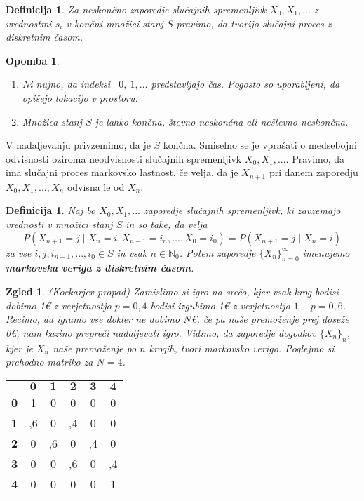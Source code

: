 \documentclass[a4paper,12pt]{article}
\def\N{\mathbb{N}} %
\newtheorem{opomba}[izrek]{Opomba}
\newtheorem{definicija}[izrek]{Definicija}
\newtheorem{zgled}[izrek]{Zgled}
\begin{document}
\begin{definicija}
    Za neskončno zaporedje slučajnih spremenljivk $X_0, X_1, ...$ z vrednostmi $s_i$ v končni množici stanj $S$ pravimo, 
    da tvorijo slučajni proces z diskretnim časom.
\end{definicija}

\begin{opomba}

    \begin{enumerate}
        \item Ni nujno, da indeksi \ $0, \ 1, ...$ predstavljajo čas. Pogosto so uporabljeni, da opišejo lokacijo v prostoru. 
        \item Množica stanj $S$ je lahko končna, števno neskončna ali neštevno neskončna. 
    \end{enumerate}

\end{opomba}

V nadaljevanju privzemimo, da je $S$ končna. Smiselno se je vprašati o medsebojni odvisnosti oziroma neodvisnosti slučajnih spremenljivk $X_0,  X_1, ...$. Pravimo, da ima slučajni proces 
markovsko lastnost, če velja, da je $X_{n+1}$ pri danem zaporedju $X_0,  X_1, ...,  X_n$ odvisna le od $X_n$.

\begin{definicija}
    Naj bo $X_0,  X_1, ...$ zaporedje slučajnih spremenljivk, ki zavzemajo vrednosti v množici stanj $S$ in so take, da velja
    $$P(X_{n+1}=j \mid X_n = i,  X_{n-1} = i_n,  ...,  X_0 = i_0) = P(X_{n+1}=j \mid X_n = i)$$
    za vse $i, j, i_{n-1}, ..., i_0 \in S$ in vsak $n \in \N_0$. Potem zaporedje $\{X_n\}_{n=0}^{\infty}$ imenujemo 
    \textbf{markovska veriga z diskretnim časom}.
\end{definicija}


\begin{zgled}
(Kockarjev propad)
Zamislimo si igro na srečo, kjer vsak krog bodisi dobimo
 1€ z verjetnostjo $p = 0{,}4$ bodisi izgubimo 1€ z verjetnostjo $1-p=0{,}6$. Recimo, da igramo vse dokler
 ne dobimo $N$€, če pa naše premoženje prej doseže 0€, nam kazino prepreči nadaljevati igro.
 Vidimo, da zaporedje dogodkov $\{X_n\}_n$, kjer je $X_n$ naše premoženje po $n$ krogih, tvori markovsko verigo.
 Poglejmo si prehodno matriko za $N=4$.
\end{zgled}
\begin{center}
\begin{tabular}{ >{\bfseries}c c c c c c }
    & $\mathbf{0}$ & $\mathbf{1}$ & $\mathbf{2}$ & $\mathbf{3}$ & $\mathbf{4}$\\ 
   0 & 1 & 0 & 0 & 0 & 0 \\  
   1 & ,6 & 0 & ,4 & 0 & 0 \\
   2 & 0 & ,6 & 0 & ,4 & 0 \\
   3 & 0 & 0 & ,6 & 0 & ,4 \\
   4 & 0 & 0 & 0 & 0 & 1                    
  \end{tabular}
\end{center}
\end{document}
